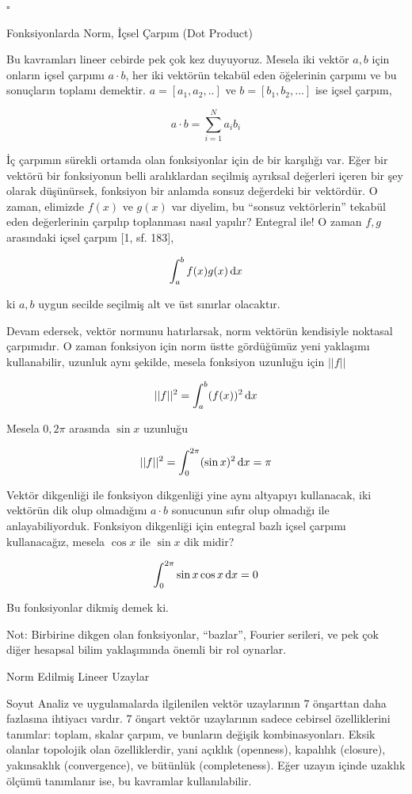 \documentclass[12pt,fleqn]{article}\usepackage{../../common}
\begin{document}
$ \square $

Fonksiyonlarda Norm, İçsel Çarpım (Dot Product)

Bu kavramları lineer cebirde pek çok kez duyuyoruz. Mesela iki vektör
$a,b$ için onların içsel çarpımı $a \cdot b$, her iki vektörün tekabül
eden öğelerinin çarpımı ve bu sonuçların toplamı demektir. $a = [a_1,a_2,..]$
ve $b = [b_1,b_2,...]$ ise içsel çarpım,

$$
a \cdot b = \sum_{i=1}^{N} a_i b_i 
$$

İç çarpımın sürekli ortamda olan fonksiyonlar için de bir karşılığı var.  Eğer
bir vektörü bir fonksiyonun belli aralıklardan seçilmiş ayrıksal değerleri
içeren bir şey olarak düşünürsek, fonksiyon bir anlamda sonsuz değerdeki bir
vektördür. O zaman, elimizde $f(x)$ ve $g(x)$ var diyelim, bu ``sonsuz
vektörlerin'' tekabül eden değerlerinin çarpılıp toplanması nasıl yapılır?
Entegral ile! O zaman $f,g$ arasındaki içsel çarpım [1, sf. 183],

$$
\int_{a}^{b} f(x) g(x) \,\mathrm{d} x
$$

ki $a,b$ uygun secilde seçilmiş alt ve üst sınırlar olacaktır. 

Devam edersek, vektör normunu hatırlarsak, norm vektörün kendisiyle noktasal
çarpımıdır. O zaman fonksiyon için norm üstte gördüğümüz yeni yaklaşımı
kullanabilir, uzunluk aynı şekilde, mesela fonksiyon uzunluğu için $||f||$

$$
||f||^2 = \int_{a}^{b} (f(x))^2 \,\mathrm{d} x
$$

Mesela $0,2\pi$ arasında $\sin x$ uzunluğu

$$
||f||^2 = \int_{0}^{2\pi} (\sin x)^2 \,\mathrm{d} x = \pi
$$

Vektör dikgenliği ile fonksiyon dikgenliği yine aynı altyapıyı kullanacak, iki
vektörün dik olup olmadığını $a \cdot b$ sonucunun sıfır olup olmadığı ile
anlayabiliyorduk. Fonksiyon dikgenliği için entegral bazlı içsel çarpımı
kullanacağız, mesela $\cos x$ ile $\sin x$ dik midir?

$$
\int_{0}^{2\pi} \sin x \cos x \,\mathrm{d} x = 0
$$

Bu fonksiyonlar dikmiş demek ki.

Not: Birbirine dikgen olan fonksiyonlar, ``bazlar'', Fourier serileri, ve pek
çok diğer hesapsal bilim yaklaşımında önemli bir rol oynarlar.


Norm Edilmiş Lineer Uzaylar

Soyut Analiz ve uygulamalarda ilgilenilen vektör uzaylarının 7 önşarttan
daha fazlasına ihtiyacı vardır. 7 önşart vektör uzaylarının sadece cebirsel
özelliklerini tanımlar: toplam, skalar çarpım, ve bunların değişik
kombinasyonları. Eksik olanlar topolojik olan özelliklerdir, yani açıklık
(openness), kapalılık (closure), yakınsaklık (convergence), ve bütünlük
(completeness). Eğer uzayın içinde uzaklık ölçümü tanımlanır ise, bu
kavramlar kullanılabilir. 
\end{document}
